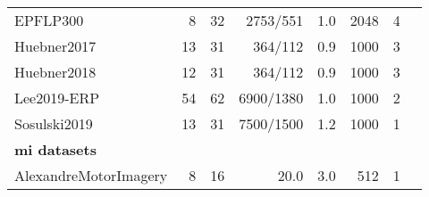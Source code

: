 \begin{tabularx}{\linewidth}{@{}Xrrrrrrr@{}}
	EPFLP300                   & 8               & 32       & 2753/551        & 1.0 & 2048 & 4                 & \cite{Hoffmann2008}      \\
	Huebner2017                & 13              & 31       & 364/112         & 0.9 & 1000 & 3                 & \cite{Huebner2017}       \\
	Huebner2018                & 12              & 31       & 364/112         & 0.9 & 1000 & 3                 & \cite{Huebner2018}       \\
	Lee2019-ERP                & 54              & 62       & 6900/1380       & 1.0 & 1000 & 2                 & \cite{Lee2019}           \\
	Sosulski2019               & 13              & 31       & 7500/1500       & 1.2 & 1000 & 1                 & \cite{Sosulski2019}      \\
	\midrule
	\textbf{\Ac{mi} datasets}  &                 &          &                 &     &      &                   &                          \\
	AlexandreMotorImagery      & 8               & 16       & 20.0            & 3.0 & 512  & 1                 & \cite{Barachant2012}     \\

\end{tabularx}
